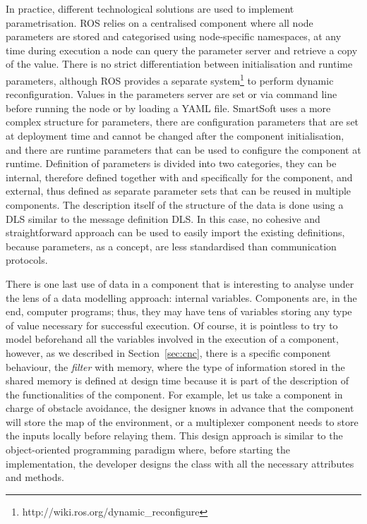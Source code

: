 In practice, different technological solutions are used to implement parametrisation. ROS relies on a centralised component where all node parameters are stored and categorised using node-specific namespaces, at any time during execution a node can query the parameter server and retrieve a copy of the value. There is no strict differentiation between initialisation and runtime parameters, although ROS provides a separate system\footnote{http://wiki.ros.org/dynamic\_reconfigure} to perform dynamic reconfiguration. Values in the parameters server are set or via command line before running the node or by loading a YAML file. SmartSoft uses a more complex structure for parameters, there are configuration parameters that are set at deployment time and cannot be changed after the component initialisation, and there are runtime parameters that can be used to configure the component at runtime. Definition of parameters is divided into two categories, they can be internal, therefore defined together with and specifically for the component, and external, thus defined as separate parameter sets that can be reused in multiple components. The description itself of the structure of the data is done using a DLS similar to the message definition DLS. In this case, no cohesive and straightforward approach can be used to easily import the existing definitions, because parameters, as a concept, are less standardised than communication protocols.

There is one last use of data in a component that is interesting to analyse under the lens of a data modelling approach: internal variables. Components are, in the end, computer programs; thus, they may have tens of variables storing any type of value necessary for successful execution. Of course, it is pointless to try to model beforehand all the variables involved in the execution of a component, however, as we described in Section~\ref{sec:cnc}, there is a specific component behaviour, the \textit{filter} with memory, where the type of information stored in the shared memory is defined at design time because it is part of the description of the functionalities of the component. For example, let us take a component in charge of obstacle avoidance, the designer knows in advance that the component will store the map of the environment, or a multiplexer component needs to store the inputs locally before relaying them. This design approach is similar to the object-oriented programming paradigm where, before starting the implementation, the developer designs the class with all the necessary attributes and methods. 

